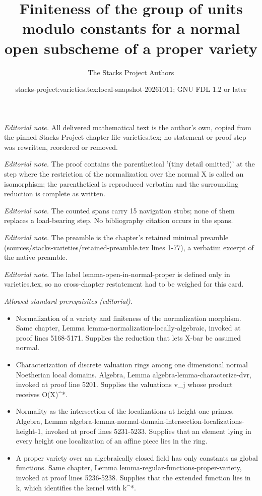 \documentclass[10pt,a4paper]{amsart}
\title{Finiteness of the group of units modulo constants for a normal open subscheme of a proper variety}
\author{The Stacks Project Authors}
\date{stacks-project:varieties.tex:local-snapshot-20261011; GNU FDL 1.2 or later}
\theoremstyle{plain}
\theoremstyle{definition}
\theoremstyle{remark}
\numberwithin{equation}{subsection}
\begin{document}
\maketitle
\noindent\textit{Editorial note.} All delivered mathematical text is the author's own, copied from the pinned Stacks Project chapter file varieties.tex; no statement or proof step was rewritten, reordered or removed.\par\medskip
\noindent\textit{Editorial note.} The proof contains the parenthetical '(tiny detail omitted)' at the step where the restriction of the normalization over the normal X is called an isomorphism; the parenthetical is reproduced verbatim and the surrounding reduction is complete as written.\par\medskip
\noindent\textit{Editorial note.} The counted spans carry 15 navigation stubs; none of them replaces a load-bearing step. No bibliography citation occurs in the spans.\par\medskip
\noindent\textit{Editorial note.} The preamble is the chapter's retained minimal preamble (sources/stacks-varieties/retained-preamble.tex lines 1-77), a verbatim excerpt of the native preamble.\par\medskip
\noindent\textit{Editorial note.} The label lemma-open-in-normal-proper is defined only in varieties.tex, so no cross-chapter restatement had to be weighed for this card.\par\medskip
\noindent\textit{Allowed standard prerequisites (editorial).}\begin{itemize}
\item Normalization of a variety and finiteness of the normalization morphism. Same chapter, Lemma lemma-normalization-locally-algebraic, invoked at proof lines 5168-5171. Supplies the reduction that lets X-bar be assumed normal.
\item Characterization of discrete valuation rings among one dimensional normal Noetherian local domains. Algebra, Lemma algebra-lemma-characterize-dvr, invoked at proof line 5201. Supplies the valuations v\_j whose product receives O(X)\textasciicircum{}*.
\item Normality as the intersection of the localizations at height one primes. Algebra, Lemma algebra-lemma-normal-domain-intersection-localizations-height-1, invoked at proof lines 5231-5233. Supplies that an element lying in every height one localization of an affine piece lies in the ring.
\item A proper variety over an algebraically closed field has only constants as global functions. Same chapter, Lemma lemma-regular-functions-proper-variety, invoked at proof lines 5236-5238. Supplies that the extended function lies in k, which identifies the kernel with k\textasciicircum{}*.
\end{itemize}\medskip
\end{document}

